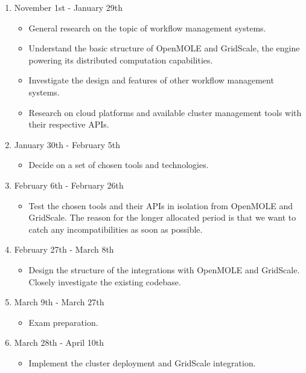 \begin{enumerate}
	\item November 1st - January 29th
	\begin{itemize}
		\item General research on the topic of workflow management systems.
		\item Understand the basic structure of OpenMOLE and GridScale, the engine powering its distributed computation capabilities.
		\item Investigate the design and features of other workflow management systems.
		\item Research on cloud platforms and available cluster management tools with their respective APIs.
	\end{itemize}
	
	\item January 30th - February 5th
	\begin{itemize}
		\item Decide on a set of chosen tools and technologies.
	\end{itemize}
	
	\item February 6th - February 26th
	\begin{itemize}
		\item Test the chosen tools and their APIs in isolation from OpenMOLE and GridScale. The reason for the longer allocated period is that we want to catch any incompatibilities as soon as possible.
	\end{itemize}
	
	\item February 27th - March 8th
	\begin{itemize}
		\item Design the structure of the integrations with OpenMOLE and GridScale. Closely investigate the existing codebase.
	\end{itemize}
	
	\item March 9th - March 27th
	\begin{itemize}
		\item Exam preparation.
	\end{itemize}
	
	\item March 28th - April 10th
	\begin{itemize}
		\item Implement the cluster deployment and GridScale integration.
	\end{itemize}


\end{enumerate}
